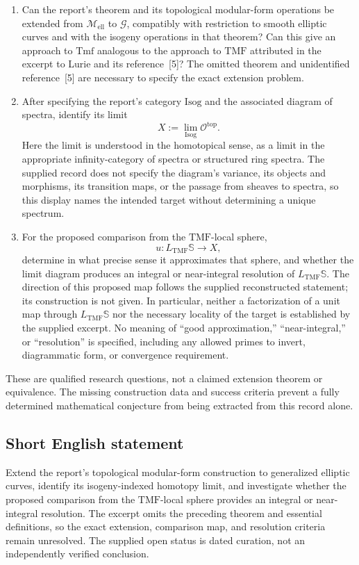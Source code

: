 \documentclass[11pt]{article}
\begin{document}
\begin{enumerate}
\item Can the report's theorem and its topological modular-form operations be extended from \(\mathcal M_{\mathrm{ell}}\) to \(\mathcal G\), compatibly with restriction to smooth elliptic curves and with the isogeny operations in that theorem? Can this give an approach to \(\mathrm{Tmf}\) analogous to the approach to \(\mathrm{TMF}\) attributed in the excerpt to Lurie and its reference~[5]? The omitted theorem and unidentified reference~[5] are necessary to specify the exact extension problem.
\item After specifying the report's category \(\mathrm{Isog}\) and the associated diagram of spectra, identify its limit
\[
X:=\operatorname*{lim}_{\mathrm{Isog}}\mathcal O^{\mathrm{top}}.
\]
Here the limit is understood in the homotopical sense, as a limit in the appropriate infinity-category of spectra or structured ring spectra. The supplied record does not specify the diagram's variance, its objects and morphisms, its transition maps, or the passage from sheaves to spectra, so this display names the intended target without determining a unique spectrum.
\item For the proposed comparison from the \(\mathrm{TMF}\)-local sphere,
\[
u\colon L_{\mathrm{TMF}}\mathbb S\longrightarrow X,
\]
determine in what precise sense it approximates that sphere, and whether the limit diagram produces an integral or near-integral resolution of \(L_{\mathrm{TMF}}\mathbb S\). The direction of this proposed map follows the supplied reconstructed statement; its construction is not given. In particular, neither a factorization of a unit map through \(L_{\mathrm{TMF}}\mathbb S\) nor the necessary locality of the target is established by the supplied excerpt. No meaning of ``good approximation,'' ``near-integral,'' or ``resolution'' is specified, including any allowed primes to invert, diagrammatic form, or convergence requirement.
\end{enumerate}

These are qualified research questions, not a claimed extension theorem or equivalence. The missing construction data and success criteria prevent a fully determined mathematical conjecture from being extracted from this record alone.
\subsection{Short English statement}
Extend the report's topological modular-form construction to generalized elliptic curves, identify its isogeny-indexed homotopy limit, and investigate whether the proposed comparison from the \(\mathrm{TMF}\)-local sphere provides an integral or near-integral resolution. The excerpt omits the preceding theorem and essential definitions, so the exact extension, comparison map, and resolution criteria remain unresolved. The supplied open status is dated curation, not an independently verified conclusion.
\end{document}
